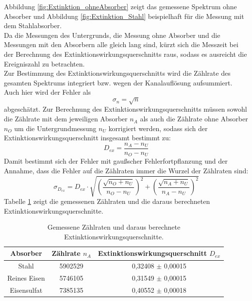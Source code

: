 \documentclass[12pt,a4paper]{article}
\begin{document}
Abbildung \ref{fig:Extinktion_ohneAbsorber} zeigt das gemessene Spektrum ohne Absorber und Abbildung \ref{fig:Extinktion_Stahl} beispielhaft für die Messung mit dem Stahlabsorber. \\
Da die Messungen des Untergrunds, die Messung ohne Absorber und die Messungen mit den Absorbern alle gleich lang sind, kürzt sich die Messzeit bei der Berechnung des Extinktionswirkungsquerschnitts raus, sodass es ausreicht die Ereigniszahl zu betrachten.\\ 
Zur Bestimmung des Extinktionswirkungsquerschnitts wird die Zählrate des gesamten Spektrums integriert bzw. wegen der Kanalauflösung aufsummiert. Auch hier wird der Fehler als 
\begin{equation*}
\sigma _{n} = \sqrt{n}
\end{equation*}
abgeschätzt. Zur Berechnung des Extinktionswirkungsquerschnitts müssen sowohl die Zählrate mit dem jeweiligen Absorber $n_A$ als auch die Zählrate ohne Absorber $n_O$ um die Untergrundmessung $n_U$ korrigiert werden, sodass sich der Extinktionswirkungsquerschnitt insgesamt bestimmt zu:
\begin{equation*}
D_{ex} = \dfrac{n_A - n_U}{n_O - n_U}
\end{equation*}
Damit bestimmt sich der Fehler mit gaußscher Fehlerfortpflanzung und der Annahme, dass die Fehler auf die Zählraten immer die Wurzel der Zählraten sind:
\begin{equation*}
\sigma _{D_{ex}} = D_{ex} \cdot \sqrt{ \left( \dfrac{\sqrt{n_O + n_U}}{n_O - n_U} \right)^2 +  \left( \dfrac{\sqrt{n_A + n_U}}{n_A - n_U} \right)^2}
\end{equation*}
Tabelle \ref{tab:Extinktion_Ergebnisse} zeigt die gemessenen Zählraten und die daraus berechneten Extinktionswirkungsquerschnitte.

\begin{table}
\centering
\begin{tabular}{|c|c|c|}
\hline 
Absorber & Zählrate $n_A$ & Extinktionswirkungsquerschnitt $D_{ex}$ \\ 
\hline 
Stahl & 5902529 & 0,32408 $\pm$ 0,00015 \\
\hline 
Reines Eisen & 5746105 & 0,31549 $\pm$ 0,00015 \\
\hline
Eisensulfat & 7385135 & 0,40552 $\pm$ 0,00018 \\
\hline
\end{tabular} 
\caption{Gemessene Zählraten und daraus berechnete Extinktionswirkungsquerschnitte.}
\label{tab:Extinktion_Ergebnisse}
\end{table}
\end{document}
